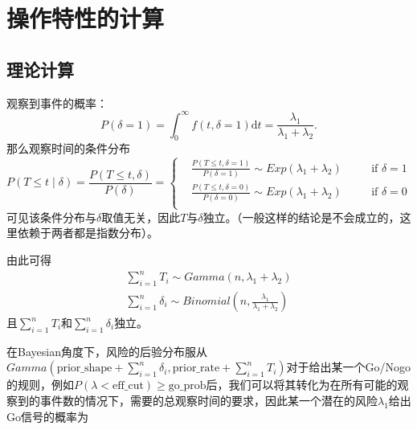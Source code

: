 \documentclass[a4paper,12pt]{article}
\begin{document}
\section{操作特性的计算}
\label{sec:computing_oc}

\subsection{理论计算}
\label{sec:theoretical_computation}

观察到事件的概率：
\[
  P\left(\delta = 1\right) = \int_0^\infty f\left(t, \delta = 1\right)\mathrm{d}t
  = \frac{\lambda_1}{\lambda_1 + \lambda_2}
  .
\]
那么观察时间的条件分布
\[
  P\left(T \leq t\middle|\delta\right) = \frac{P\left(T\leq t, \delta\right)}{P\left(\delta\right)}
  = \left\{
    \begin{aligned}
          & \frac{P\left(T\leq t, \delta = 1\right)}{P\left(\delta = 1\right)}
    \sim Exp\left(\lambda_1 + \lambda_2\right)
    &&\quad \text{if } \delta = 1    \\
    & \frac{P\left(T\leq t, \delta = 0\right)}{P\left(\delta = 0\right)}
    \sim Exp\left(\lambda_1 + \lambda_2\right)
    &&\quad \text{if } \delta = 0    \\
    \end{aligned}
  \right.
\]
可见该条件分布与$\delta$取值无关，因此$T$与$\delta$独立。（一般这样的结论是不会成立的，这里依赖于两者都是指数分布）。
\par
由此可得
\[
  \begin{aligned}
    \sum\limits_{i = 1}^nT_i \sim Gamma\left(n, \lambda_1 + \lambda_2\right)    \\
    \sum\limits_{i = 1}^n\delta_i \sim Binomial(n, \frac{\lambda_1}{\lambda_1 + \lambda_2})
  \end{aligned}
\]
且$\sum\limits_{i = 1}^nT_i$和$\sum\limits_{i = 1}^n\delta_i$独立。
\par
在Bayesian角度下，风险的后验分布服从$Gamma\left(\text{prior\_shape} + \sum\limits_{i = 1}^n\delta_i, \text{prior\_rate} + \sum\limits_{i = 1}^nT_i\right)$对于给出某一个Go/Nogo的规则，例如$P\left(\lambda < \text{eff\_cut}\right) \geq \text{go\_prob}$后，我们可以将其转化为在所有可能的观察到的事件数的情况下，需要的总观察时间的要求，因此某一个潜在的风险$\lambda_1$给出Go信号的概率为
\end{document}
